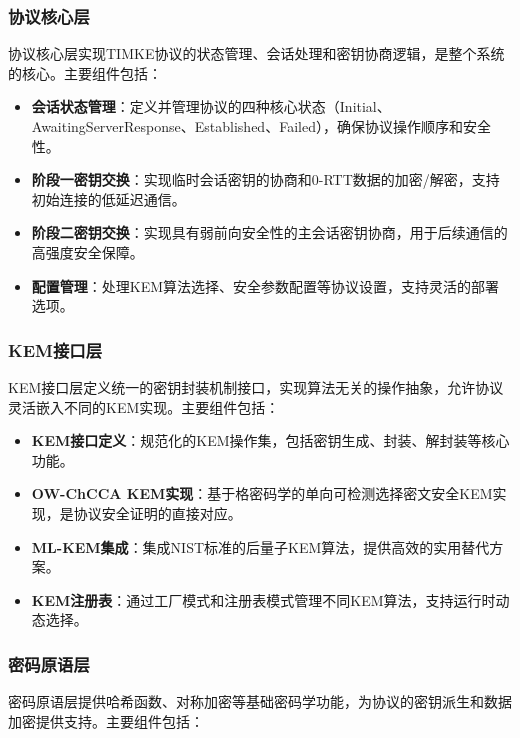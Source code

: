 \subsubsection{协议核心层}
协议核心层实现TIMKE协议的状态管理、会话处理和密钥协商逻辑，是整个系统的核心。主要组件包括：

\begin{itemize}
    \item \textbf{会话状态管理}：定义并管理协议的四种核心状态（Initial、AwaitingServerResponse、Established、Failed），确保协议操作顺序和安全性。
    
    \item \textbf{阶段一密钥交换}：实现临时会话密钥的协商和0-RTT数据的加密/解密，支持初始连接的低延迟通信。
    
    \item \textbf{阶段二密钥交换}：实现具有弱前向安全性的主会话密钥协商，用于后续通信的高强度安全保障。
    
    \item \textbf{配置管理}：处理KEM算法选择、安全参数配置等协议设置，支持灵活的部署选项。
\end{itemize}

\subsubsection{KEM接口层}
KEM接口层定义统一的密钥封装机制接口，实现算法无关的操作抽象，允许协议灵活嵌入不同的KEM实现。主要组件包括：

\begin{itemize}
    \item \textbf{KEM接口定义}：规范化的KEM操作集，包括密钥生成、封装、解封装等核心功能。
    
    \item \textbf{OW-ChCCA KEM实现}：基于格密码学的单向可检测选择密文安全KEM实现，是协议安全证明的直接对应。
    
    \item \textbf{ML-KEM集成}：集成NIST标准的后量子KEM算法，提供高效的实用替代方案。
    
    \item \textbf{KEM注册表}：通过工厂模式和注册表模式管理不同KEM算法，支持运行时动态选择。
\end{itemize}

\subsubsection{密码原语层}
密码原语层提供哈希函数、对称加密等基础密码学功能，为协议的密钥派生和数据加密提供支持。主要组件包括：

